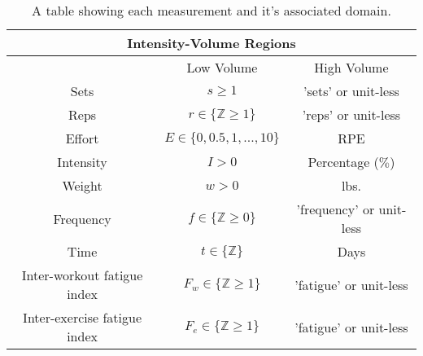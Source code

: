 \begin{table}[h]
	\centering
    \begin{tabular}{|c|c|c|}
	    \hline
	    \multicolumn{3}{|c|}{Intensity-Volume Regions} \\
	    \hline
         & Low Volume & High Volume \\
        \hline
        Sets & $s\ge 1$ & 'sets' or unit-less\\
        Reps & $r\in \{ \mathbb{Z} \ge 1 \}$ & 'reps' or unit-less \\
        Effort & $E\in \{0,0.5,1,...,10\}$ & RPE \\
        Intensity & $I>0$ & Percentage ($\%$) \\
        Weight & $w>0$ & lbs. \\
        Frequency & $f\in \{ \mathbb{Z}\ge 0 \}$ & 'frequency' or unit-less \\
        Time & $t\in \{ \mathbb{Z} \}$ & Days \\
        Inter-workout fatigue index & $F_w\in \{ \mathbb{Z} \ge 1 \}$ & 'fatigue' or unit-less \\
        Inter-exercise fatigue index & $F_e\in \{ \mathbb{Z} \ge 1 \}$ & 'fatigue' or unit-less \\
        \hline
    \end{tabular}
    \caption{A table showing each measurement and it's associated domain.}
    \label{tab:DomainUnitTable}
\end{table}
